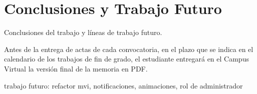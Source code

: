 \chapter{Conclusiones y Trabajo Futuro}
\label{cap:conclusiones}

\cite{BibTexOriginal}

Conclusiones del trabajo y líneas de trabajo futuro.

Antes de la entrega de actas de cada convocatoria, en el plazo que se indica en el calendario de los trabajos de fin de grado, el estudiante entregará en el Campus Virtual la versión final de la memoria en PDF.

trabajo futuro: refactor mvi, notificaciones, animaciones, rol de administrador


